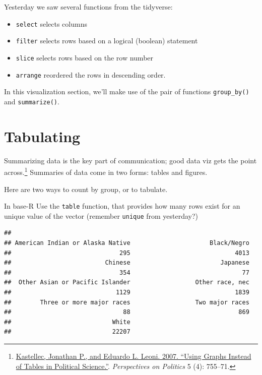 \documentclass[]{book}
\newenvironment{Shaded}{\begin{snugshade}}{\end{snugshade}}
\newcommand{\KeywordTok}[1]{\textcolor[rgb]{0.13,0.29,0.53}{\textbf{#1}}}
\newcommand{\NormalTok}[1]{#1}
\newcommand{\OperatorTok}[1]{\textcolor[rgb]{0.81,0.36,0.00}{\textbf{#1}}}
\providecommand{\tightlist}{%
  \setlength{\itemsep}{0pt}\setlength{\parskip}{0pt}}
\let\rmarkdownfootnote\footnote%
\def\footnote{\protect\rmarkdownfootnote}
\theoremstyle{definition}
\theoremstyle{definition}
\theoremstyle{definition}
\theoremstyle{remark}
\begin{document}
Yesterday we saw several functions from the tidyverse:

\begin{itemize}
\tightlist
\item
  \texttt{select} selects columns
\item
  \texttt{filter} selects rows based on a logical (boolean) statement
\item
  \texttt{slice} selects rows based on the row number
\item
  \texttt{arrange} reordered the rows in descending order.
\end{itemize}

In this visualization section, we'll make use of the pair of functions \texttt{group\_by()} and \texttt{summarize()}.

\hypertarget{tabulating}{%
\section{Tabulating}\label{tabulating}}

Summarizing data is the key part of communication; good data viz gets the point across.\footnote{\href{http://www.princeton.edu/~jkastell/Tables2Graphs/graphs.pdf}{Kastellec, Jonathan P., and Eduardo L. Leoni. 2007. ``Using Graphs Instead of Tables in Political Science.''}. \emph{Perspectives on Politics} 5 (4): 755--71.} Summaries of data come in two forms: tables and figures.

Here are two ways to count by group, or to tabulate.

In base-R Use the \texttt{table} function, that provides how many rows exist for an unique value of the vector (remember \texttt{unique} from yesterday?)

\begin{Shaded}
\end{Shaded}

\begin{verbatim}
## 
## American Indian or Alaska Native                      Black/Negro 
##                              295                             4013 
##                          Chinese                         Japanese 
##                              354                               77 
##  Other Asian or Pacific Islander                  Other race, nec 
##                             1129                             1839 
##        Three or more major races                  Two major races 
##                               88                              869 
##                            White 
##                            22207
\end{verbatim}
\end{document}
